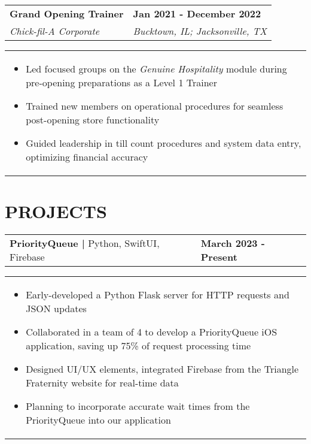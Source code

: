 \documentclass[10pt]{article}
\begin{document}
\vspace{-5pt}

\noindent \begin{tabularx}{\textwidth}{X >{\raggedleft\arraybackslash}X}
\textbf{Grand Opening Trainer}  & \textbf{Jan 2021 - December 2022} \\
\textit{Chick-fil-A Corporate} & \textit{Bucktown, IL; Jacksonville, TX} \\
\end{tabularx}

\vspace{-5pt}

\noindent \begin{tabularx}{\textwidth}{X}
\begin{itemize}[leftmargin=0.75cm, noitemsep, topsep=0pt, parsep=0pt, partopsep=0pt]
\item Led focused groups on the \textit{Genuine Hospitality} module during pre-opening preparations as a Level 1 Trainer
\item Trained new members on operational procedures for seamless post-opening store functionality
\item Guided leadership in till count procedures and system data entry, optimizing financial accuracy

\end{itemize}
\end{tabularx}


\section*{PROJECTS}

\noindent \begin{tabularx}{\textwidth}{X >{\raggedleft\arraybackslash}X}
\textbf{PriorityQueue | } Python, SwiftUI, Firebase & \textbf{March 2023 - Present} \\
\end{tabularx}

\vspace{-5pt}

\noindent \begin{tabularx}{\textwidth}{X}
\begin{itemize}[leftmargin=0.75cm, noitemsep, topsep=0pt, parsep=0pt, partopsep=0pt]
\item Early-developed a Python Flask server for HTTP requests and JSON updates
\item Collaborated in a team of 4 to develop a PriorityQueue iOS application, saving up 75\% of request processing time
\item Designed UI/UX elements, integrated Firebase from the Triangle Fraternity website for real-time data
\item Planning to incorporate accurate wait times from the PriorityQueue into our application
\end{itemize}
\end{tabularx}
\end{document}
